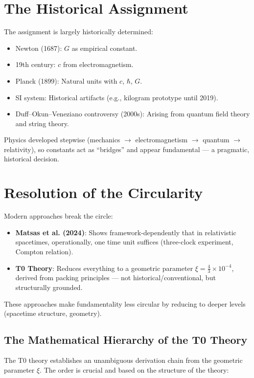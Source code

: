 	\section{The Historical Assignment}
	The assignment is largely historically determined:
	\begin{itemize}
		\item Newton (1687): $G$ as empirical constant.
		\item 19th century: $c$ from electromagnetism.
		\item Planck (1899): Natural units with $c$, $\hbar$, $G$.
		\item SI system: Historical artifacts (e.g., kilogram prototype until 2019).
		\item Duff--Okun--Veneziano controversy (2000s): Arising from quantum field theory and string theory.
	\end{itemize}
	Physics developed stepwise (mechanics $\to$ electromagnetism $\to$ quantum $\to$ relativity), so constants act as ``bridges'' and appear fundamental --- a pragmatic, historical decision.
	
	\section{Resolution of the Circularity}
	Modern approaches break the circle:
	\begin{itemize}
		\item \textbf{Matsas et al. (2024)}: Shows framework-dependently that in relativistic spacetimes, operationally, one time unit suffices (three-clock experiment, Compton relation).
		\item \textbf{T0 Theory}: Reduces everything to a geometric parameter $\xi = \frac{4}{3} \times 10^{-4}$, derived from packing principles --- not historical/conventional, but structurally grounded.
	\end{itemize}
	These approaches make fundamentality less circular by reducing to deeper levels (spacetime structure, geometry).
	
	\subsection{The Mathematical Hierarchy of the T0 Theory}
	
	The T0 theory establishes an unambiguous derivation chain from the geometric parameter $\xi$. The order is crucial and based on the structure of the theory:
	

